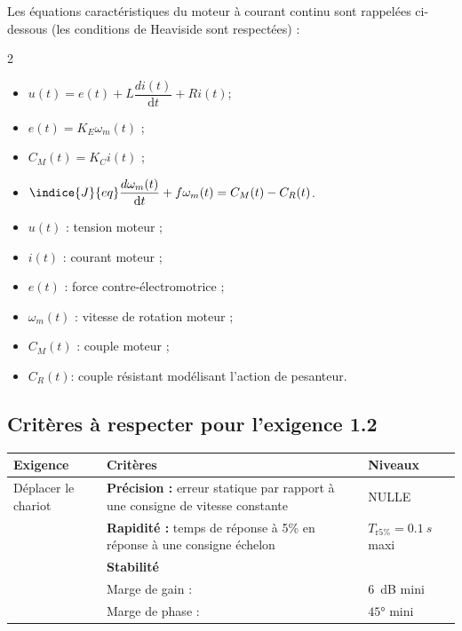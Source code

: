  

Les équations caractéristiques du moteur à courant continu sont rappelées ci-dessous (les conditions de Heaviside sont respectées) :
\begin{multicols}{2}
\begin{itemize}[label=,font=\color{bleuxp}] 
\item $u(t)=e(t)+L \dfrac{di(t)}{\text{d} t}+Ri(t)$;
\item $e(t)=K_E \omega_m (t)$ ;
\item $C_M (t)=K_C i(t)$ ;
\item $\indice{J}{eq}  \dfrac{d\omega_m(t)}{\text{d} t}+f\omega_m (t)=C_M (t)-C_R (t)$.
\end{itemize}

\begin{itemize}[label=,font=\color{bleuxp}] 
\item $u(t)$ : tension moteur ;
\item $i(t)$ : courant moteur ; 
\item $e(t)$ : force contre-électromotrice ;
\item $\omega_m(t)$ : vitesse de rotation moteur ;
\item $C_M (t)$ : couple moteur ;
\item $C_R (t)$: couple résistant modélisant l'action de pesanteur.
\end{itemize}
\end{multicols}

\fi

\subsection*{Critères à respecter pour l'exigence 1.2}
\ifprof
\else
\footnotesize{
\begin{center}
\begin{tabular}{p{2.5cm}p{5cm}p{3cm}}
\hline
Exigence	& Critères & Niveaux \\ \hline
Déplacer le chariot	& \textbf{Précision :}
erreur statique par rapport à une consigne de vitesse constante	
& NULLE \\ 
	& \textbf{Rapidité :} temps de réponse à 5\% en réponse à une consigne échelon 
	& $T_{\text{r} 5\%} = \SI{0,1}{s}$  maxi \\ 
	& \textbf{Stabilité} & \\
	& Marge de gain :& \SI{6}{dB} mini \\
	&Marge de phase :& $\ang{45}$ mini \\
\hline
\end{tabular}
\end{center}}
\normalsize
\fi
